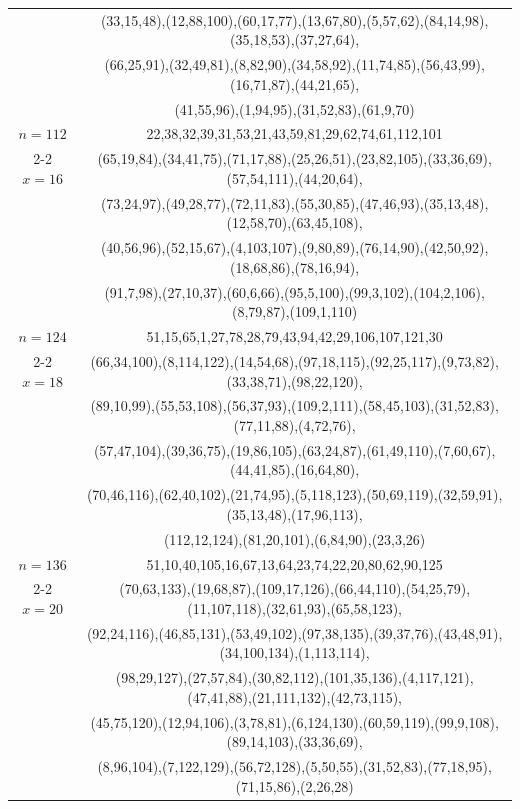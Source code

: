 \begin{tabular}{| c | c |}
&(33,15,48),(12,88,100),(60,17,77),(13,67,80),(5,57,62),(84,14,98),(35,18,53),(37,27,64),\\
&(66,25,91),(32,49,81),(8,82,90),(34,58,92),(11,74,85),(56,43,99),(16,71,87),(44,21,65),\\
&(41,55,96),(1,94,95),(31,52,83),(61,9,70)\\
\hline 
\(n=112\) & 
22,38,32,39,31,53,21,43,59,81,29,62,74,61,112,101\\
\cline{2-2}
\(x=16\)
&(65,19,84),(34,41,75),(71,17,88),(25,26,51),(23,82,105),(33,36,69),(57,54,111),(44,20,64),\\
&(73,24,97),(49,28,77),(72,11,83),(55,30,85),(47,46,93),(35,13,48),(12,58,70),(63,45,108),\\
&(40,56,96),(52,15,67),(4,103,107),(9,80,89),(76,14,90),(42,50,92),(18,68,86),(78,16,94),\\
&(91,7,98),(27,10,37),(60,6,66),(95,5,100),(99,3,102),(104,2,106),(8,79,87),(109,1,110)\\
\hline 
\(n=124\) & 
51,15,65,1,27,78,28,79,43,94,42,29,106,107,121,30\\
\cline{2-2}
\(x=18\)
&(66,34,100),(8,114,122),(14,54,68),(97,18,115),(92,25,117),(9,73,82),(33,38,71),(98,22,120),\\
&(89,10,99),(55,53,108),(56,37,93),(109,2,111),(58,45,103),(31,52,83),(77,11,88),(4,72,76),\\
&(57,47,104),(39,36,75),(19,86,105),(63,24,87),(61,49,110),(7,60,67),(44,41,85),(16,64,80),\\
&(70,46,116),(62,40,102),(21,74,95),(5,118,123),(50,69,119),(32,59,91),(35,13,48),(17,96,113),\\
&(112,12,124),(81,20,101),(6,84,90),(23,3,26)\\
\hline 
\(n=136\) & 
51,10,40,105,16,67,13,64,23,74,22,20,80,62,90,125\\
\cline{2-2}
\(x=20\)
&(70,63,133),(19,68,87),(109,17,126),(66,44,110),(54,25,79),(11,107,118),(32,61,93),(65,58,123),\\
&(92,24,116),(46,85,131),(53,49,102),(97,38,135),(39,37,76),(43,48,91),(34,100,134),(1,113,114),\\
&(98,29,127),(27,57,84),(30,82,112),(101,35,136),(4,117,121),(47,41,88),(21,111,132),(42,73,115),\\
&(45,75,120),(12,94,106),(3,78,81),(6,124,130),(60,59,119),(99,9,108),(89,14,103),(33,36,69),\\
&(8,96,104),(7,122,129),(56,72,128),(5,50,55),(31,52,83),(77,18,95),(71,15,86),(2,26,28)\\
\hline 
\end{tabular}